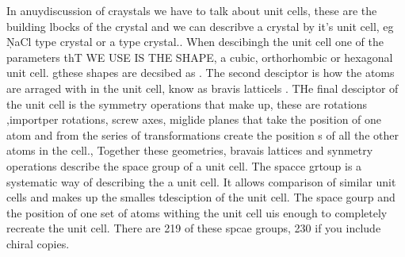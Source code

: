 \documentclass{article}
\begin{document}
In anuydiscussion of craystals we have to talk about  unit cells, these are the building lbocks of the crystal and we can describve a crystal by it's unit cell, eg \c{NaCl} type crystal or a  type crystal.. When descibingh the unit cell one of the parameters thT WE USE IS THE SHAPE, a cubic, orthorhombic or hexagonal unit cell. gthese shapes are decsibed as \tocheck. The second desciptor is how the atoms are arraged with in the unit cell, know as bravis latticels . THe final desciptor of the unit cell is the symmetry operations that make  up, these are rotations ,importper rotations, screw axes, miglide planes that take the position of one atom and from the series of transformations create the position s of all the other atoms in the cell., Together these geometries, bravais lattices and synmetry operations describe the space group of a unit cell. The spacce grtoup is a systematic way of describing the a unit cell. It allows comparison of similar unit cells and makes up the smalles tdesciption of the unit cell. The space gourp and the position of one set of atoms withing the unit cell uis enough to completely recreate the unit cell. There are 219 of these spcae groups, 230 if you include chiral copies. 
\end{document}
